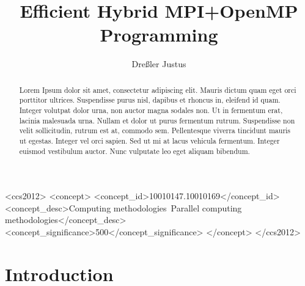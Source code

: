 \documentclass[sigconf]{acmart}
\begin{document}
\title{Efficient Hybrid MPI+OpenMP Programming}
\author{Dreßler Justus}


\begin{CCSXML}
    <ccs2012>
    <concept>
    <concept_id>10010147.10010169</concept_id>
    <concept_desc>Computing methodologies~Parallel computing methodologies</concept_desc>
    <concept_significance>500</concept_significance>
    </concept>
    </ccs2012>
\end{CCSXML}


\begin{abstract}

    Lorem Ipsum dolor sit amet, consectetur adipiscing elit.
    Mauris dictum quam eget orci porttitor ultrices.
    Suspendisse purus nisl, dapibus et rhoncus in, eleifend id quam. Integer volutpat dolor urna, non auctor magna sodales non.
    Ut in fermentum erat, lacinia malesuada urna.
    Nullam et dolor ut purus fermentum rutrum.
    Suspendisse non velit sollicitudin, rutrum est at, commodo sem. Pellentesque viverra tincidunt mauris ut egestas.
    Integer vel orci sapien. Sed ut mi at lacus vehicula fermentum.
    Integer euismod vestibulum auctor.
    Nunc vulputate leo eget aliquam bibendum.

\end{abstract}

\maketitle

\section{Introduction}

\end{document}
